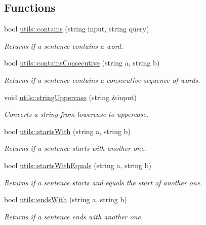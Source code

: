 \subsection*{Functions}
\begin{DoxyCompactItemize}
\item 
bool \hyperlink{namespaceutils_a69c832543a093a8099189e4755695a62}{utils\+::contains} (string input, string query)
\begin{DoxyCompactList}\small\item\em Returns if a sentence contains a word. \end{DoxyCompactList}\item 
bool \hyperlink{namespaceutils_af9af9e01b679f955003203f29ddf130b}{utils\+::contains\+Consecutive} (string a, string b)
\begin{DoxyCompactList}\small\item\em Returns if a sentence contains a consecutive sequence of words. \end{DoxyCompactList}\item 
void \hyperlink{namespaceutils_a4cc31521e740c9e31b4bfa8ee85eff46}{utils\+::string\+Uppercase} (string \&input)
\begin{DoxyCompactList}\small\item\em Converts a string from lowercase to uppercase. \end{DoxyCompactList}\item 
bool \hyperlink{namespaceutils_ae840ea1b4ad4ce23c2b48158ac75d557}{utils\+::starts\+With} (string a, string b)
\begin{DoxyCompactList}\small\item\em Returns if a sentence starts with another one. \end{DoxyCompactList}\item 
bool \hyperlink{namespaceutils_ac8cc8683906877c69cfea7cb2812ed07}{utils\+::starts\+With\+Equals} (string a, string b)
\begin{DoxyCompactList}\small\item\em Returns if a sentence starts and equals the start of another one. \end{DoxyCompactList}\item 
bool \hyperlink{namespaceutils_a57772e91d08481b38c47cda04479e169}{utils\+::ends\+With} (string a, string b)
\begin{DoxyCompactList}\small\item\em Returns if a sentence ends with another one. \end{DoxyCompactList}\item 

\end{DoxyCompactItemize}
